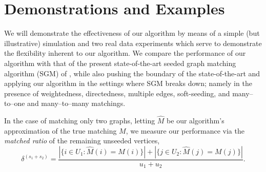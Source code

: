 \documentclass[12pt]{article}
\numberwithin{equation}{section}
\theoremstyle{definition}
\begin{document}
\section{Demonstrations and Examples}
\label{S:ex}
We will demonstrate the effectiveness of our algorithm by means of a
simple (but illustrative) simulation and two real data experiments which
serve to demonstrate the flexibility inherent to our algorithm.  We
compare the performance of our algorithm with that of the present
state-of-the-art seeded graph matching algorithm (SGM) of
\cite{FAP}, while also pushing the boundary of the state-of-the-art and
applying our algorithm in the settings where SGM breaks down; namely in
the presence of weightedness, directedness, multiple edges,
soft-seeding, and many--to--one and many--to--many matchings.

In the case of matching only two graphs, letting $\widehat{M}$ be our algorithm's approximation of the true matching $M$, we measure our performance via the {\it matched ratio} of the remaining unseeded vertices,
\begin{equation}
\label{matchrat}
\delta^{(s_1+s_2)}=
\frac{\left|\{i\in U_1:\widehat{M}(i) = M(i)\}\right|+\left|\{j\in U_2:\widehat{M}(j) = M(j)\}\right|}{u_1+u_2}.
\end{equation}
\end{document}
